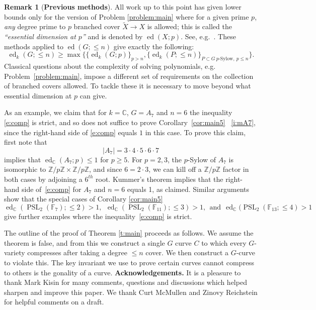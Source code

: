 \documentclass[11pt]{amsart}
\theoremstyle{definition}
\newtheorem{remark}[theorem]{Remark}
\numberwithin{equation}{section}
\newcommand{\Cb}{\mathbb{C}}
\newcommand{\F}{\mathbb{F}}
\newcommand{\Zb}{\mathbb{Z}}
\DeclareMathOperator{\PSL}{PSL}
\DeclareMathOperator{\ed}{ed}
\begin{document}
\begin{remark}[{\bf Previous methods}]\label{r:prev}
All work up to this point has given lower bounds only for the version of Problem \ref{problem:main} where for a given prime $p$, {\em any} degree prime to $p$ branched cover $\widetilde{X}\to X$ is allowed; this is called  the {\em ``essential dimension at $p$''} and is denoted by $\ed(X;p)$.  See, e.g.\ \cite{BR2, ReiYo,KM,Rei,FKW,BF,FKW2,FKW3}.  These methods applied to $\ed(G;\leq n)$ give exactly the following:
\begin{equation}\label{e:comp}
    \ed_k(G;\le n)\ge  \max\{\{\ed_k(G;p)\}_{p>n},\{\ed_k(P;\le n)\}_{P\subset G~p\text{-Sylow},~p\le n}\}.
\end{equation}
Classical questions about the complexity of solving polynomials, e.g. Problem~\ref{problem:main}, impose a different set of requirements on the collection of branched covers allowed.  To tackle these it is necessary 
to move beyond what essential dimension at $p$ can give. 

As an example, we claim that for $k=\Cb$, $G=A_7$ and $n=6$ the inequality \eqref{e:comp} is strict, and so does not suffice to prove Corollary~\ref{cor:main5} ~\eqref{i:mA7}, since the right-hand side of  \eqref{e:comp} equals $1$ in this case.  To prove this claim, first 
note that 
\[
    |A_7|=3\cdot 4\cdot 5\cdot 6\cdot 7
\]
implies that $\ed_{\Cb}(A_7;p)\le 1$ for $p\ge 5$.  For $p=2,3$, the $p$-Sylow of $A_7$ is isomorphic to $\Zb/p\Zb\times\Zb/p\Zb$, and since $6=2\cdot 3$, we can kill off a $\Zb/p\Zb$ factor in both cases by adjoining a $6^{th}$ root. Kummer's theorem implies that the right-hand side of~\eqref{e:comp} for $A_7$ and $n=6$ equals 1, as claimed. Similar arguments show that the special cases of Corollary \ref{cor:main5}
\[\ed_{\Cb}(\PSL_2(\F_7);\leq 2)>1, \ \ \ed_{\Cb}(\PSL_2(\F_{11});\leq 3)>1, \ \ \text{and}\ \ \ed_{\Cb}(\PSL_2(\F_{13};\le 4)>1\]
give further examples where the inequality~\eqref{e:comp} is strict.  
\end{remark}
  
The outline of the proof of Theorem \ref{t:main} proceeds as follows.   We assume the theorem is false, and from this we construct a single $G$ curve $C$ to which every $G$-variety compresses after taking a degree $\leq n$ cover.  We then construct a $G$-curve to violate this.  The key invariant we use to prove certain curves cannot compress to others is the gonality of a curve.
\smallskip
\newline
\noindent
{\bf Acknowledgements.}
It is a pleasure to thank Mark Kisin for many comments, questions and discussions which helped sharpen and improve this paper.  We thank Curt McMullen and Zinovy Reichstein for helpful comments on a draft. 
\end{document}
